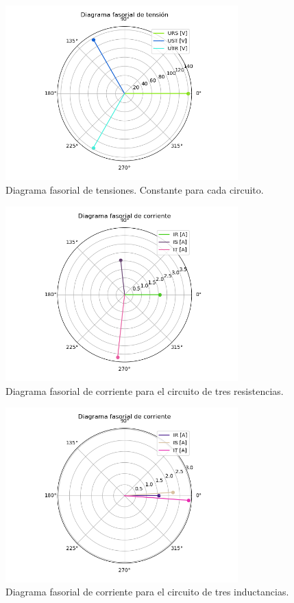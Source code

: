 \documentclass[a4paper]{article}
\begin{document}
\begin{figure}[H]
	\centering
	\includegraphics[width=0.8\textwidth]{Tensiones}
\caption{Diagrama fasorial de tensiones. Constante para cada circuito.}
	\label{fig:tensiones}
\end{figure}

\begin{figure}[H]
	\centering
	\includegraphics[width=0.8\textwidth]{Corriente-RRR}
\caption{Diagrama fasorial de corriente para el circuito de tres resistencias.}
	\label{fig:corriente-rrr}
\end{figure}

\begin{figure}[H]
	\centering
	\includegraphics[width=0.8\textwidth]{Corriente-LLL}
\caption{Diagrama fasorial de corriente para el circuito de tres inductancias.}
	\label{fig:corriente-lll}
\end{figure}
\end{document}
